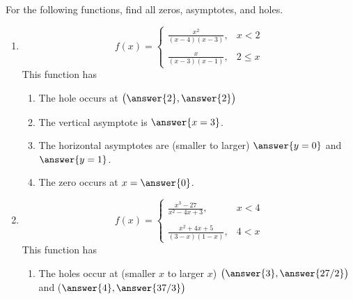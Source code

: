 \documentclass{ximera}
\author{Elizabeth Campolongo}
\begin{document}
\begin{exercise}
For the following functions, find all zeros, asymptotes, and holes. 
%
\begin{enumerate}
%
\item \begin{equation*}
	f(x) = \begin{cases}
		\frac{x^2}{(x-4)(x-3)},  & x <2 \\
		\\
		\frac{x}{(x-3)(x-1)},  & 2 \leq x 
		\end{cases}
		\end{equation*}
This function has
\begin{selectAll}
\end{selectAll}
%
\begin{exercise}
\begin{enumerate}
\item The hole occurs at $\big(\answer{2},\answer{2}\big)$

\item The vertical asymptote is $\answer{x=3}$.

\item The horizontal asymptotes are (smaller to larger) $\answer{y=0}$ and $\answer{y=1}$.

\item The zero occurs at $x=\answer{0}$.
\end{enumerate}
\end{exercise}

\item \begin{equation*}
	f(x) = \begin{cases}
		\frac{x^3-27}{x^2 - 4x+3},  & x < 4 \\
		\\
		\frac{x^2+4x+5}{(3-x)(1-x)},  & 4 < x 
		\end{cases}
		\end{equation*}
This function has
\begin{selectAll}
\end{selectAll}
%
\begin{exercise}
\begin{enumerate}
\item The holes occur at (smaller $x$ to larger $x$) $\big(\answer{3},\answer{27/2}\big)$ and \big($\answer{4},\answer{37/3}\big)$


\end{enumerate}
\end{exercise}
\end{enumerate}
\end{exercise}
\end{document}
